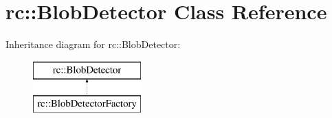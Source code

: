 \hypertarget{classrc_1_1BlobDetector}{\section{rc\+:\+:Blob\+Detector Class Reference}
\label{classrc_1_1BlobDetector}
}
Inheritance diagram for rc\+:\+:Blob\+Detector\+:\begin{figure}[H]
\begin{center}
\leavevmode
\includegraphics[height=2.000000cm]{classrc_1_1BlobDetector}
\end{center}
\end{figure}

